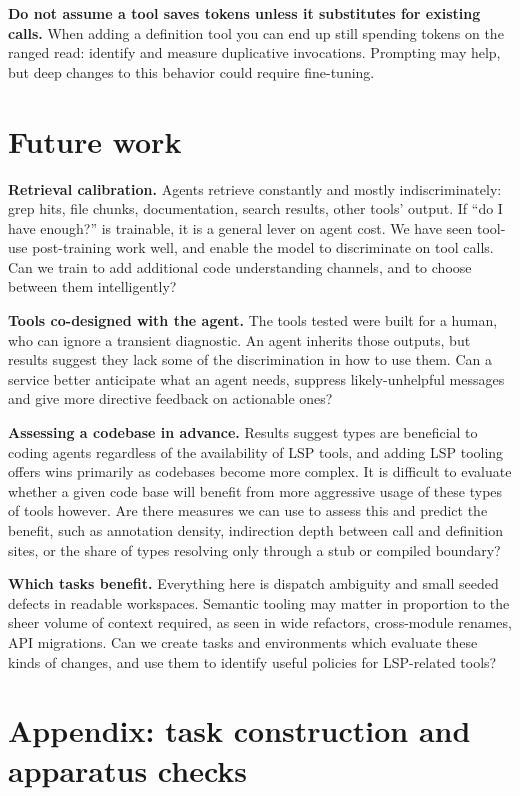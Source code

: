 \documentclass[
]{article}
\begin{document}
\textbf{Do not assume a tool saves tokens unless it substitutes for
existing calls.} When adding a definition tool you can end up still
spending tokens on the ranged read: identify and measure duplicative
invocations. Prompting may help, but deep changes to this behavior could
require fine-tuning.

\section{Future work}\label{future-work}

\textbf{Retrieval calibration.} Agents retrieve constantly and mostly
indiscriminately: grep hits, file chunks, documentation, search results,
other tools' output. If ``do I have enough?'' is trainable, it is a
general lever on agent cost. We have seen tool-use post-training work
well, and enable the model to discriminate on tool calls. Can we train
to add additional code understanding channels, and to choose between
them intelligently?

\textbf{Tools co-designed with the agent.} The tools tested were built
for a human, who can ignore a transient diagnostic. An agent inherits
those outputs, but results suggest they lack some of the discrimination
in how to use them. Can a service better anticipate what an agent needs,
suppress likely-unhelpful messages and give more directive feedback on
actionable ones?

\textbf{Assessing a codebase in advance.} Results suggest types are
beneficial to coding agents regardless of the availability of LSP tools,
and adding LSP tooling offers wins primarily as codebases become more
complex. It is difficult to evaluate whether a given code base will
benefit from more aggressive usage of these types of tools however. Are
there measures we can use to assess this and predict the benefit, such
as annotation density, indirection depth between call and definition
sites, or the share of types resolving only through a stub or compiled
boundary?

\textbf{Which tasks benefit.} Everything here is dispatch ambiguity and
small seeded defects in readable workspaces. Semantic tooling may matter
in proportion to the sheer volume of context required, as seen in wide
refactors, cross-module renames, API migrations. Can we create tasks and
environments which evaluate these kinds of changes, and use them to
identify useful policies for LSP-related tools?

\section{Appendix: task construction and apparatus
checks}\label{appendix-task-construction-and-apparatus-checks}
\end{document}
